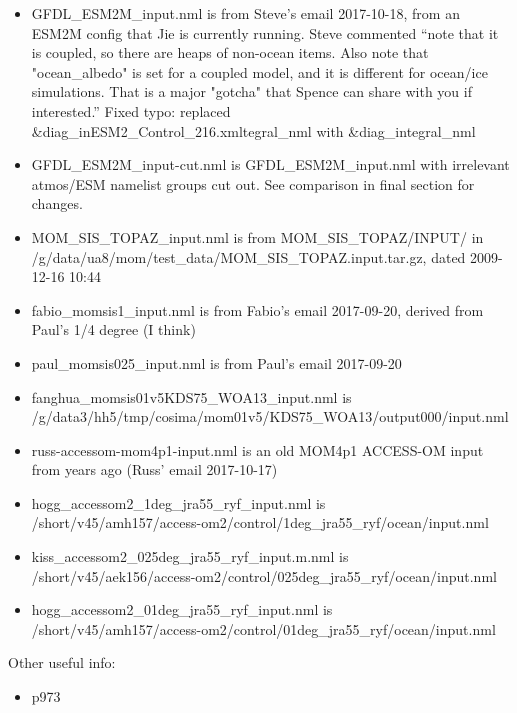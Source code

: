 \documentclass[10pt]{article}
\begin{document}
\begin{itemize}
\item GFDL_ESM2M_input.nml is from Steve's email 2017-10-18, from an ESM2M config that Jie is currently running. Steve commented ``note that it is coupled, so there are heaps of non-ocean items.  Also note that "ocean_albedo" is set for a coupled model, and it is different for ocean/ice simulations.  That is a major "gotcha" that Spence can share with you if interested.'' Fixed typo: replaced 
\&diag_inESM2_Control_216.xmltegral_nml
with
 \&diag_integral_nml
\item GFDL_ESM2M_input-cut.nml is GFDL_ESM2M_input.nml with irrelevant atmos/ESM namelist groups cut out. See comparison in final section for changes.
\item MOM_SIS_TOPAZ_input.nml is from MOM_SIS_TOPAZ/INPUT/ in\\ /g/data/ua8/mom/test_data/MOM_SIS_TOPAZ.input.tar.gz, dated 2009-12-16 10:44
\item fabio_momsis1_input.nml is from Fabio's email 2017-09-20, derived from Paul's 1/4 degree (I think)
\item paul_momsis025_input.nml is from Paul's email 2017-09-20
\item fanghua_momsis01v5KDS75_WOA13_input.nml is \\ /g/data3/hh5/tmp/cosima/mom01v5/KDS75_WOA13/output000/input.nml
\item russ-accessom-mom4p1-input.nml is an old MOM4p1 ACCESS-OM input from years ago (Russ' email 2017-10-17)
\item hogg_accessom2_1deg_jra55_ryf_input.nml is \\ /short/v45/amh157/access-om2/control/1deg_jra55_ryf/ocean/input.nml
\item kiss_accessom2_025deg_jra55_ryf_input.m.nml is \\ /short/v45/aek156/access-om2/control/025deg_jra55_ryf/ocean/input.nml
\item hogg_accessom2_01deg_jra55_ryf_input.nml is \\ /short/v45/amh157/access-om2/control/01deg_jra55_ryf/ocean/input.nml
\end{itemize}

Other useful info:
\begin{itemize}
\item \citet{GriffiesWintonAndersonBensonDelworthDufourDunneGoddardMorrison2015a} p973
\end{itemize}
\end{document}
